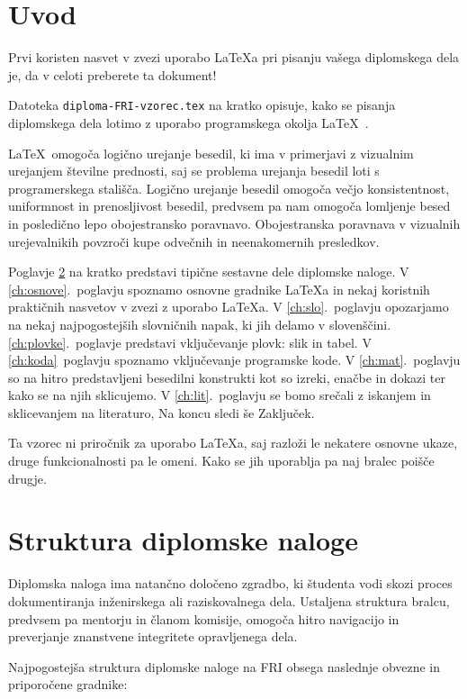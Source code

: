 \documentclass[a4paper,12pt,openright]{book}
\begin{document}
\chapter{Uvod}
Prvi koristen nasvet v zvezi uporabo \LaTeX{a} pri pisanju vašega diplomskega dela je, da v celoti preberete ta dokument!

Datoteka {\tt diploma-FRI-vzorec.tex} na kratko opisuje, kako se pisanja diplomskega dela lotimo z uporabo programskega okolja \LaTeX~\cite{lamport,nenajkrajsi}.

\LaTeX\ omogoča logično urejanje besedil, ki ima v primerjavi z vizualnim urejanjem številne prednosti, saj se problema urejanja besedil loti s programerskega stališča.
Logično urejanje besedil omogoča večjo konsistentnost, uniformnost in prenosljivost besedil, predvsem pa nam omogoča lomljenje besed in posledično lepo obojestransko poravnavo. Obojestranska poravnava v vizualnih urejevalnikih povzroči kupe odvečnih in neenakomernih presledkov. 

Poglavje \ref{ch:struktura} na kratko predstavi tipične sestavne dele diplomske naloge.
V \ref{ch:osnove}.~poglavju spoznamo osnovne gradnike \LaTeX{a} in nekaj koristnih praktičnih nasvetov v zvezi z uporabo \LaTeX{a}. 
V \ref{ch:slo}.~poglavju opozarjamo na nekaj najpogostejših slovničnih napak, ki jih delamo v slovenščini.
\ref{ch:plovke}.~poglavje predstavi vključevanje plovk: slik in tabel.
V \ref{ch:koda}~poglavju spoznamo vključevanje programske kode. 
V \ref{ch:mat}.~poglavju so na hitro predstavljeni besedilni konstrukti kot so izreki, enačbe in dokazi ter kako se na njih sklicujemo.
V \ref{ch:lit}.~poglavju se bomo srečali z iskanjem in sklicevanjem na literaturo,
Na koncu sledi še Zaključek.

Ta vzorec ni priročnik za uporabo \LaTeX{a}, saj razloži le nekatere osnovne ukaze, druge funkcionalnosti pa le omeni. Kako se jih uporablja
pa naj bralec poišče drugje.

\chapter{Struktura diplomske naloge}
\label{ch:struktura}

Diplomska naloga ima natančno določeno zgradbo, ki študenta vodi skozi proces dokumentiranja inženirskega ali raziskovalnega dela. Ustaljena struktura bralcu, predvsem pa mentorju in članom komisije, omogoča hitro navigacijo in preverjanje znanstvene integritete opravljenega dela.

Najpogostejša struktura diplomske naloge na FRI obsega naslednje obvezne in priporočene gradnike:
\end{document}
